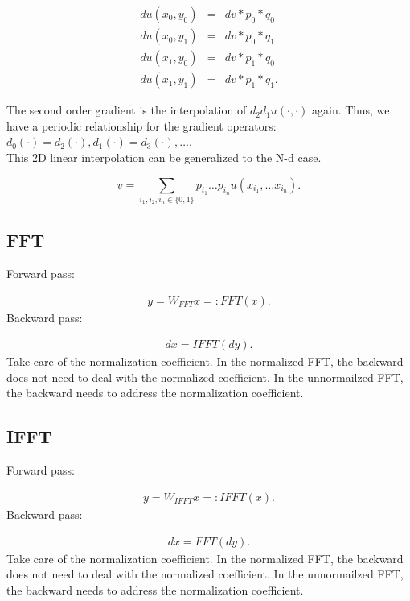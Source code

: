 \documentclass{article}
\begin{document}
\begin{eqnarray}
  du(x_0, y_0) &=& dv * p_0 * q_0 \\
  du(x_0, y_1) &=& dv * p_0 * q_1 \\
  du(x_1, y_0) &=& dv * p_1 * q_0 \\
  du(x_1, y_1) &=& dv * p_1 * q_1.
\end{eqnarray}

The second order gradient is the interpolation of $d_2d_1 u(\cdot, \cdot)$ again. Thus, we have a periodic relationship for the gradient operators: $d_0(\cdot) = d_2(\cdot), d_1(\cdot) = d_3(\cdot), \ldots$.\\

This 2D linear interpolation can be generalized to the N-d case.

\begin{equation}
  v = \sum_{i_1, i_2, i_n \in \{0, 1\}} p_{i_1}\dots p_{i_n} u(x_{i_1}, \ldots x_{i_n}).
\end{equation}

\subsection{FFT}

Forward pass:

\begin{eqnarray}
  y = W_{FFT}x =: FFT(x).
\end{eqnarray}
%
Backward pass:

\begin{eqnarray}
  dx = IFFT(dy).
\end{eqnarray}
%
Take care of the normalization coefficient. In the normalized FFT, the backward does not need to deal with the normalized coefficient. In the unnormailzed FFT, the backward needs to address the normalization coefficient.

\subsection{IFFT}

Forward pass:

\begin{eqnarray}
  y = W_{IFFT}x =: IFFT(x).
\end{eqnarray}
%
Backward pass:

\begin{eqnarray}
  dx = FFT(dy).
\end{eqnarray}
%
Take care of the normalization coefficient. In the normalized FFT, the backward does not need to deal with the normalized coefficient. In the unnormailzed FFT, the backward needs to address the normalization coefficient.
\end{document}
